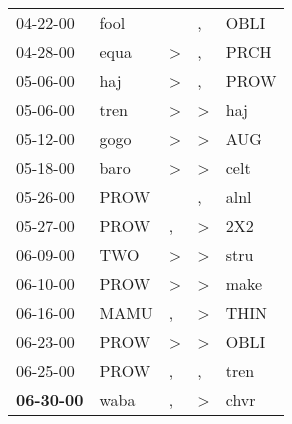 \begin{supertabular}{p{0.07\textwidth}p{0.06\textwidth}p{0.02\textwidth}p{0.02\textwidth}p{0.06\textwidth}}
          04-22-00\textsuperscript{} &           fool\textsuperscript{} &                  &                , &           OBLI\textsuperscript{} \\
          04-28-00\textsuperscript{} &           equa\textsuperscript{} &     \textgreater &                , &           PRCH\textsuperscript{} \\
          05-06-00\textsuperscript{} &            haj\textsuperscript{} &     \textgreater &                , &           PROW\textsuperscript{} \\
          05-06-00\textsuperscript{} &           tren\textsuperscript{} &     \textgreater &     \textgreater &            haj\textsuperscript{} \\
          05-12-00\textsuperscript{} &           gogo\textsuperscript{} &     \textgreater &     \textgreater &            AUG\textsuperscript{} \\
          05-18-00\textsuperscript{} &           baro\textsuperscript{} &     \textgreater &     \textgreater &           celt\textsuperscript{} \\
          05-26-00\textsuperscript{} &           PROW\textsuperscript{} &                  &                , &           alnl\textsuperscript{} \\
          05-27-00\textsuperscript{} &           PROW\textsuperscript{} &                , &     \textgreater &            2X2\textsuperscript{} \\
          06-09-00\textsuperscript{} &            TWO\textsuperscript{} &     \textgreater &     \textgreater &           stru\textsuperscript{} \\
          06-10-00\textsuperscript{} &           PROW\textsuperscript{} &     \textgreater &     \textgreater &           make\textsuperscript{} \\
          06-16-00\textsuperscript{} &           MAMU\textsuperscript{} &                , &     \textgreater &           THIN\textsuperscript{} \\
          06-23-00\textsuperscript{} &           PROW\textsuperscript{} &     \textgreater &     \textgreater &           OBLI\textsuperscript{} \\
          06-25-00\textsuperscript{} &           PROW\textsuperscript{} &                , &                , &           tren\textsuperscript{} \\
 \textbf{06-30-00\textsuperscript{}} &           waba\textsuperscript{} &                , &     \textgreater &           chvr\textsuperscript{} \\

\end{supertabular}
